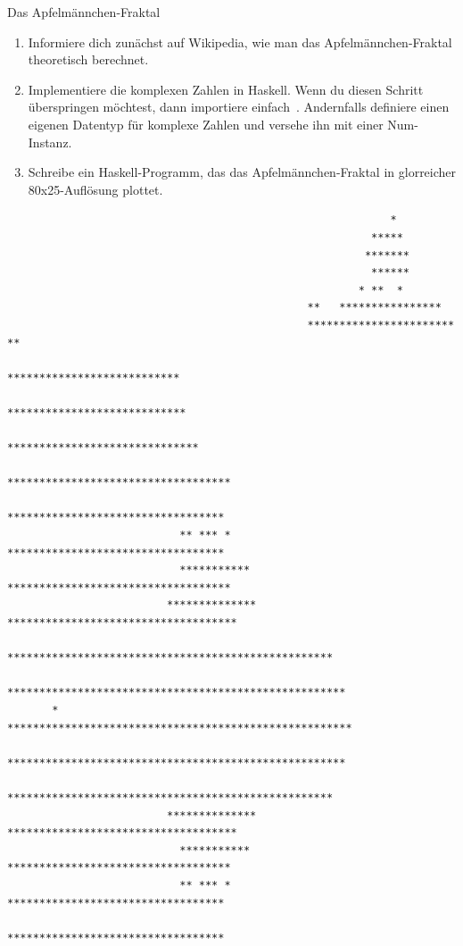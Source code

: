 \documentclass{uebblatt}
\begin{document}
\begin{aufgabe}{Das Apfelmännchen-Fraktal}
\begin{enumerate}
\item Informiere dich zunächst auf Wikipedia, wie man das Apfelmännchen-Fraktal
theoretisch berechnet.
\item Implementiere die komplexen Zahlen in Haskell. Wenn du diesen Schritt
überspringen möchtest, dann importiere einfach~.
Andernfalls definiere einen eigenen Datentyp für komplexe Zahlen und versehe
ihn mit einer Num-Instanz.
\item Schreibe ein Haskell-Programm, das das Apfelmännchen-Fraktal in
glorreicher 80x25-Auflösung plottet.
\end{enumerate}
\begin{tiny}\begin{verbatim}
                                                            *
                                                         *****
                                                        *******
                                                         ******
                                                       * **  *
                                               **   ****************
                                               ***********************  **
                                               ***************************
                                             ****************************
                                            ******************************
                                          ***********************************
                                          **********************************
                           ** *** *       **********************************
                           ***********   ***********************************
                         ************** ************************************
                         ***************************************************
                     *****************************************************
       *          ******************************************************
                     *****************************************************
                         ***************************************************
                         ************** ************************************
                           ***********   ***********************************
                           ** *** *       **********************************
                                          **********************************

\end{verbatim}
\end{tiny}
\end{aufgabe}
\end{document}

